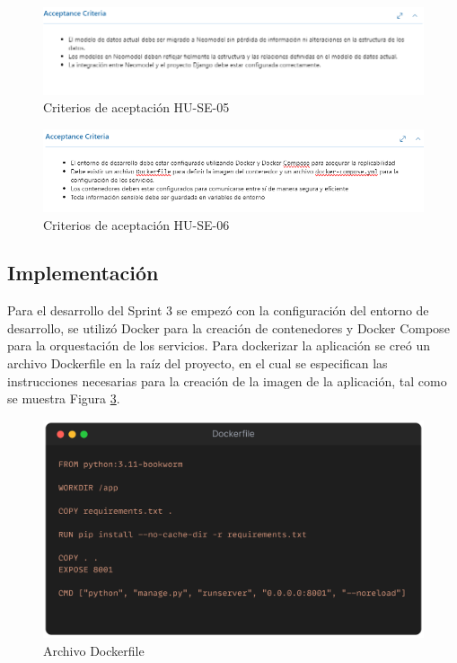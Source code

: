 \begin{figure}[H]
    \centering
    \includegraphics[scale=0.7]{../02Figures/02Chapter/Sprints/Sprint-3/aceptance-criteria-HU-SE-05.png}
    \caption{Criterios de aceptación HU-SE-05}
    \label{fig:aceptance-criteria-HU-SE-05}
\end{figure}

\begin{figure}[H]
    \centering
    \includegraphics[scale=0.7]{../02Figures/02Chapter/Sprints/Sprint-3/aceptance-criteria-HU-SE-06.png}
    \caption{Criterios de aceptación HU-SE-06}
    \label{fig:aceptance-criteria-HU-SE-06}
\end{figure}

\subsection{Implementación}
Para el desarrollo del Sprint 3 se empezó con la configuración del entorno de desarrollo, se utilizó Docker para la creación de contenedores y Docker Compose para la orquestación de los servicios.
Para dockerizar la aplicación se creó un archivo Dockerfile en la raíz del proyecto, en el cual se especifican las instrucciones necesarias para la creación de la imagen de la aplicación, tal como se muestra Figura \ref{fig:dockerfile}.

\begin{figure}[!t]
    \centering
    \includegraphics[scale=0.12]{../02Figures/02Chapter/Sprints/Sprint-3/Dockerfile.png}
    \caption{Archivo Dockerfile}
    \label{fig:dockerfile}
\end{figure}

